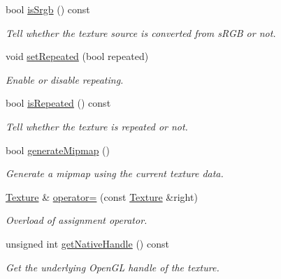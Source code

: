 \begin{DoxyCompactItemize}
bool \hyperlink{classsf_1_1_texture_a9d77ce4f8124abfda96900a6bd53bfe9}{is\+Srgb} () const
\begin{DoxyCompactList}\small\item\em Tell whether the texture source is converted from s\+R\+GB or not. \end{DoxyCompactList}\item 
void \hyperlink{classsf_1_1_texture_aaa87d1eff053b9d4d34a24c784a28658}{set\+Repeated} (bool repeated)
\begin{DoxyCompactList}\small\item\em Enable or disable repeating. \end{DoxyCompactList}\item 
bool \hyperlink{classsf_1_1_texture_af1a1a32ca5c799204b2bea4040df7647}{is\+Repeated} () const
\begin{DoxyCompactList}\small\item\em Tell whether the texture is repeated or not. \end{DoxyCompactList}\item 
bool \hyperlink{classsf_1_1_texture_a7779a75c0324b5faff77602f871710a9}{generate\+Mipmap} ()
\begin{DoxyCompactList}\small\item\em Generate a mipmap using the current texture data. \end{DoxyCompactList}\item 
\hyperlink{classsf_1_1_texture}{Texture} \& \hyperlink{classsf_1_1_texture_a80a089b6b19bb09b83012d5f0e6af9ba}{operator=} (const \hyperlink{classsf_1_1_texture}{Texture} \&right)
\begin{DoxyCompactList}\small\item\em Overload of assignment operator. \end{DoxyCompactList}\item 
unsigned int \hyperlink{classsf_1_1_texture_a674b632608747bfc27b53a4935c835b0}{get\+Native\+Handle} () const
\begin{DoxyCompactList}\small\item\em Get the underlying Open\+GL handle of the texture. \end{DoxyCompactList}\end{DoxyCompactItemize}
